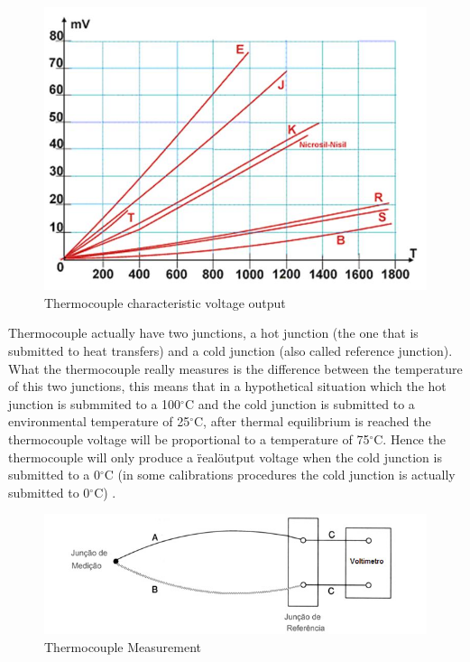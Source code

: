 	\begin{figure}[htbp]
		\centering
			\includegraphics[width=.8\textwidth]{figuras/fig-thermocouple-output.jpg}
		\caption{Thermocouple characteristic voltage output \cite{termo-curves}}
		\label{fig:thermocoupleVoltage}
	\end{figure}
		
	Thermocouple actually have two junctions, a hot junction (the one that is submitted to heat transfers) and a cold junction (also called reference junction). What the thermocouple really measures is the difference between the temperature of this two junctions, this means that in a hypothetical situation which the hot junction is submmited to a 100$^{\circ}$C and the cold junction is submitted to a environmental temperature of 25$^{\circ}$C, after thermal equilibrium is reached the thermocouple voltage will be proportional to a temperature of 75$^{\circ}$C. Hence the thermocouple will only produce a \"real\" output voltage when the cold junction is submitted to a 0$^{\circ}$C (in some calibrations procedures the cold junction is actually submitted to 0$^{\circ}$C) \cite{kinzie1973thermocouple}.
		
	\begin{figure}[htbp]
		\centering
			\includegraphics[width=.8\textwidth]{figuras/fig-thermocouple-measurement.jpg}
		\caption{Thermocouple Measurement \cite{termo-med}}
		\label{fig:thermocoupleMeasurement}
	\end{figure}
		
